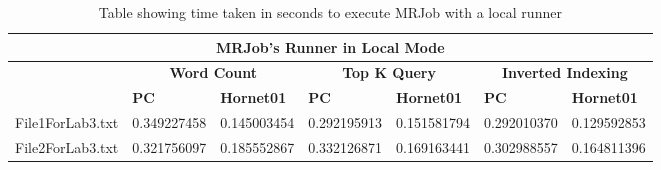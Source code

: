 \documentclass[10pt, twocolumn]{article}
\begin{document}
\begin{table}[H]
\centering
\caption{Table showing time taken in seconds to execute MRJob with a local runner}
\label{tbl:MRJobLocalRunnerResults}
\begin{tabular}{|l|l|l|l|l|l|l|}
\hline
\multicolumn{7}{|c|}{\textbf{MRJob's Runner in Local Mode}}                                                                                                                                                 \\ \hline
\textbf{}                         & \multicolumn{2}{c|}{\textbf{Word Count}}                                  & \multicolumn{2}{c|}{\textbf{Top K Query}} & \multicolumn{2}{c|}{\textbf{Inverted Indexing}} \\ \hline
 &\multicolumn{1}{l|}{\textbf{PC}} & \multicolumn{1}{l|}{\textbf{Hornet01}} & \textbf{PC}      & \textbf{Hornet01}      & \textbf{PC}         & \textbf{Hornet01}         \\ \cline{1-7} 
File1ForLab3.txt                                  & 0.349227458                      & 0.145003454                            & 0.292195913      & 0.151581794            & 0.292010370         & 0.129592853               \\ \hline
File2ForLab3.txt                  & 0.321756097                      & 0.185552867                            & 0.332126871      & 0.169163441            & 0.302988557         & 0.164811396               \\ \hline
\end{tabular}
\end{table}
\end{document}

